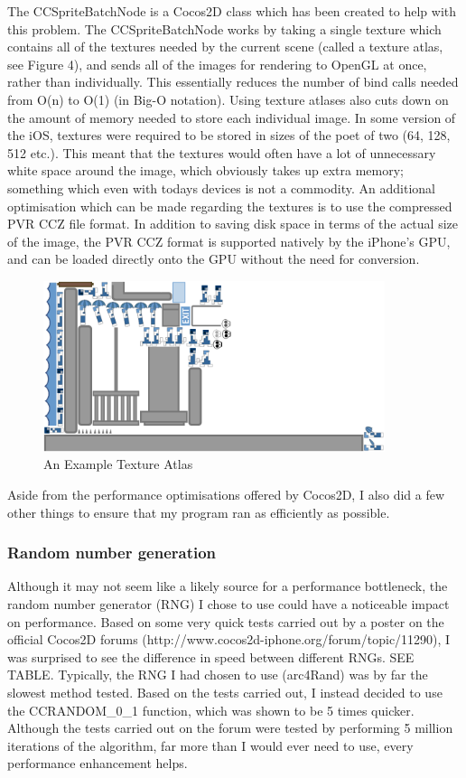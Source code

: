 \documentclass[a4paper,oneside]{report}
\begin{document}
The CCSpriteBatchNode is a Cocos2D class which has been created to help with this problem. The CCSpriteBatchNode works by taking a single texture which contains all of the textures needed by the current scene (called a texture atlas, see Figure 4), and sends all of the images for rendering to OpenGL at once, rather than individually. This essentially reduces the number of bind calls needed from O(n) to O(1) (in Big-O notation). Using texture atlases also cuts down on the amount of memory needed to store each individual image. In some version of the iOS, textures were required to be stored in sizes of the poet of two (64, 128, 512 etc.). This meant that the textures would often have a lot of unnecessary white space around the image, which obviously takes up extra memory; something which even with todays devices is not a commodity. An additional optimisation which can be made regarding the textures is to use the compressed PVR CCZ file format. In addition to saving disk space in terms of the actual size of the image, the PVR CCZ format is supported natively by the iPhone's GPU, and can be loaded directly onto the GPU without the need for conversion.

\begin{figure}[h!]
  \centering
    \includegraphics[width=100mm]{sources/images/Texture_atlas}
    \caption{An Example Texture Atlas}
\end{figure}

Aside from the performance optimisations offered by Cocos2D, I also did a few other things to ensure that my program ran as efficiently as possible.

\subsubsection{Random number generation} 

Although it may not seem like a likely source for a performance bottleneck, the random number generator (RNG) I chose to use could have a noticeable impact on performance. Based on some very quick tests carried out by a poster on the official Cocos2D forums (http://www.cocos2d-iphone.org/forum/topic/11290), I was surprised to see the difference in speed between different RNGs. SEE TABLE. Typically, the RNG I had chosen to use (arc4Rand) was by far the slowest method tested. Based on the tests carried out, I instead decided to use the CCRANDOM\_0\_1 function, which was shown to be 5 times quicker. Although the tests carried out on the forum were tested by performing 5 million iterations of the algorithm, far more than I would ever need to use, every performance enhancement helps.
		
\end{document}
